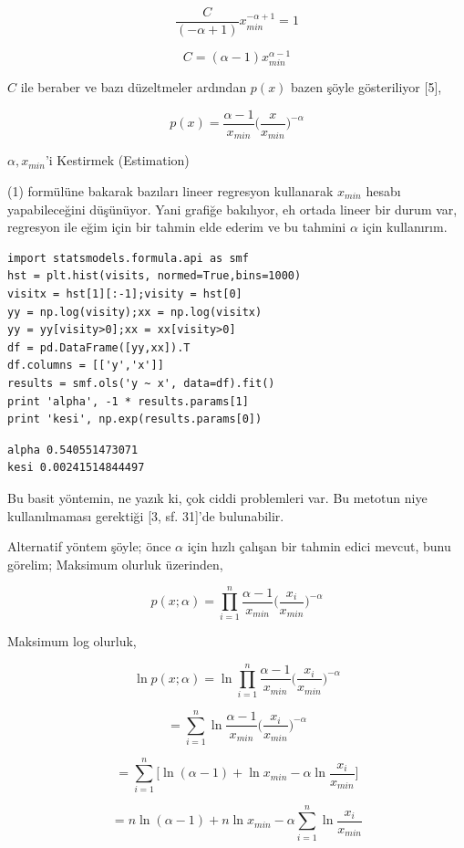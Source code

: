\documentclass[12pt,fleqn]{article}\usepackage{../../common}
\begin{document}
$$ \frac{C}{(-\alpha+1) }  x_{min}^{-\alpha+1} = 1$$

$$ C = (\alpha-1)x_{min}^{\alpha-1} $$

$C$ ile beraber ve bazı düzeltmeler ardından $p(x)$ bazen şöyle
gösteriliyor [5], 

$$ p(x) = \frac{\alpha-1}{x_{min}}\bigg( \frac{x}{x_{min}} \bigg)^{-\alpha}  $$

$\alpha,x_{min}$'i Kestirmek (Estimation)

(1) formülüne bakarak bazıları lineer regresyon kullanarak $x_{min}$ hesabı
yapabileceğini düşünüyor. Yani grafiğe bakılıyor, eh ortada lineer bir
durum var, regresyon ile eğim için bir tahmin elde ederim ve bu tahmini
$\alpha$ için kullanırım. 

\begin{verbatim}
import statsmodels.formula.api as smf
hst = plt.hist(visits, normed=True,bins=1000)
visitx = hst[1][:-1];visity = hst[0]
yy = np.log(visity);xx = np.log(visitx)
yy = yy[visity>0];xx = xx[visity>0]
df = pd.DataFrame([yy,xx]).T
df.columns = [['y','x']]
results = smf.ols('y ~ x', data=df).fit()
print 'alpha', -1 * results.params[1]
print 'kesi', np.exp(results.params[0])
\end{verbatim}

\begin{verbatim}
alpha 0.540551473071
kesi 0.00241514844497
\end{verbatim}

Bu basit yöntemin, ne yazık ki, çok ciddi problemleri var. Bu metotun niye
kullanılmaması gerektiği [3, sf. 31]'de bulunabilir.

Alternatif yöntem şöyle; önce $\alpha$ için hızlı çalışan bir tahmin edici
mevcut, bunu görelim; Maksimum olurluk üzerinden,

$$ p(x;\alpha) = \prod _{i=1}^{n} \frac{\alpha-1}{x_{min}} \bigg( \frac{x_i}{x_{min}}\bigg)^{-\alpha}  $$

Maksimum log olurluk,

$$ \ln p(x;\alpha) = \ln \prod _{i=1}^{n} \frac{\alpha-1}{x_{min}} \bigg( \frac{x_i}{x_{min}}\bigg)^{-\alpha}  $$

$$ = \sum _{i=1}^{n} \ln \frac{\alpha-1}{x_{min}} \bigg( \frac{x_i}{x_{min}}\bigg)^{-\alpha}  $$

$$ = \sum _{i=1}^{n} \bigg[ \ln (\alpha-1) + \ln x_{min} - \alpha \ln \frac{x_i}{x_{min}} \bigg]   $$

$$ = n \ln (\alpha-1) + n \ln x_{min} - \alpha \sum _{i=1}^{n}  \ln \frac{x_i}{x_{min}}   $$
\end{document}
